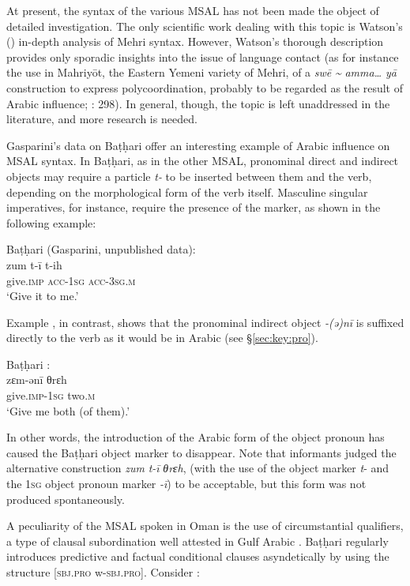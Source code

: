 \documentclass[output=paper]{langsci/langscibook}
\begin{document}
At present, the syntax of the various MSAL has not been made the object of detailed investigation. The only scientific work dealing with this topic is Watson's (\citeyear{Watson2012}) in-depth analysis of Mehri syntax. However, Watson’s thorough description provides only sporadic insights into the issue of language contact (as for instance the use in Mahriyōt, the Eastern Yemeni variety of Mehri, of a \textit{swē} \textit{{\textasciitilde}} \textit{amma…} \textit{yā} construction to express polycoordination, probably to be regarded as the result of Arabic influence; \citealt{Watson2012}: 298). In general, though, the topic is left unaddressed in the literature, and more research is needed.

Gasparini’s data on Baṭḥari offer an interesting example of Arabic influence on MSAL syntax. In Baṭḥari, as in the other MSAL, pronominal direct and indirect objects may require a particle \textit{t-} to be inserted between them and the verb, depending on the morphological form of the verb itself. Masculine singular imperatives, for instance, require the presence of the marker, as shown in the following example:

\ea	
{Baṭḥari (Gasparini, unpublished data):}\\
\gll zum t-ī t-ih\\
     give.\textsc{imp} \textsc{acc-1sg} \textsc{acc-3sg.m} \\
\glt `Give it to me.'
\z

Example , in contrast, shows that the pronominal indirect object \textit{-(ə)nī} is suffixed directly to the verb as it would be in Arabic (see §\ref{sec:key:pro}).

\ea\label{ex:key:ani}
{Baṭḥari \citep[66]{Gasparini2018}:}\\
\gll zɛm-ənī θrɛh\\
     give.\textsc{imp}-\textsc{1sg} two\textsc{.m}\\
\glt `Give me both (of them).'
\z

 In other words, the introduction of the Arabic form of the object pronoun has caused the Baṭḥari object marker to disappear. Note that informants judged the alternative construction \textit{zum} \textit{t-ī} \textit{θrɛh}, (with the use of the object marker \textit{t}- and the 1\textsc{sg} object pronoun marker \textit{-ī}) to be acceptable, but this form was not produced spontaneously.

A peculiarity of the MSAL spoken in Oman is the use of circumstantial qualifiers, a type of clausal subordination well attested in Gulf Arabic \citep{Persson2009}. Baṭḥari regularly introduces predictive and factual conditional clauses asyndetically by using the structure [\textsc{sbj.pro} w-\textsc{sbj.pro}]. Consider :
\end{document}
